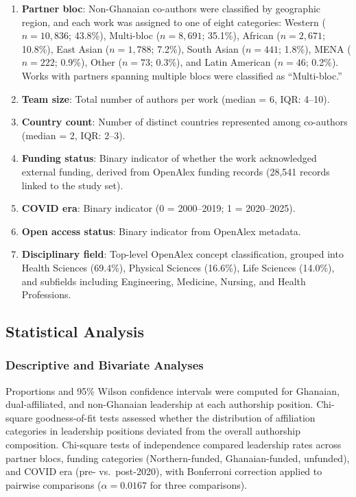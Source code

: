 \documentclass[12pt, a4paper]{article}
\begin{document}
\begin{enumerate}
    \item \textbf{Partner bloc}: Non-Ghanaian co-authors were classified by geographic region, and each work was assigned to one of eight categories: Western ($n = 10{,}836$; 43.8\%), Multi-bloc ($n = 8{,}691$; 35.1\%), African ($n = 2{,}671$; 10.8\%), East Asian ($n = 1{,}788$; 7.2\%), South Asian ($n = 441$; 1.8\%), MENA ($n = 222$; 0.9\%), Other ($n = 73$; 0.3\%), and Latin American ($n = 46$; 0.2\%). Works with partners spanning multiple blocs were classified as ``Multi-bloc.''
    
    \item \textbf{Team size}: Total number of authors per work (median = 6, IQR: 4--10).
    
    \item \textbf{Country count}: Number of distinct countries represented among co-authors (median = 2, IQR: 2--3).
    
    \item \textbf{Funding status}: Binary indicator of whether the work acknowledged external funding, derived from OpenAlex funding records (28,541 records linked to the study set).
    
    \item \textbf{COVID era}: Binary indicator (0 = 2000--2019; 1 = 2020--2025).
    
    \item \textbf{Open access status}: Binary indicator from OpenAlex metadata.
    
    \item \textbf{Disciplinary field}: Top-level OpenAlex concept classification, grouped into Health Sciences (69.4\%), Physical Sciences (16.6\%), Life Sciences (14.0\%), and subfields including Engineering, Medicine, Nursing, and Health Professions.
\end{enumerate}

\subsection{Statistical Analysis}

\subsubsection{Descriptive and Bivariate Analyses}

Proportions and 95\% Wilson confidence intervals were computed for Ghanaian, dual-affiliated, and non-Ghanaian leadership at each authorship position. Chi-square goodness-of-fit tests assessed whether the distribution of affiliation categories in leadership positions deviated from the overall authorship composition. Chi-square tests of independence compared leadership rates across partner blocs, funding categories (Northern-funded, Ghanaian-funded, unfunded), and COVID era (pre- vs.\ post-2020), with Bonferroni correction applied to pairwise comparisons ($\alpha = 0.0167$ for three comparisons).
\end{document}
